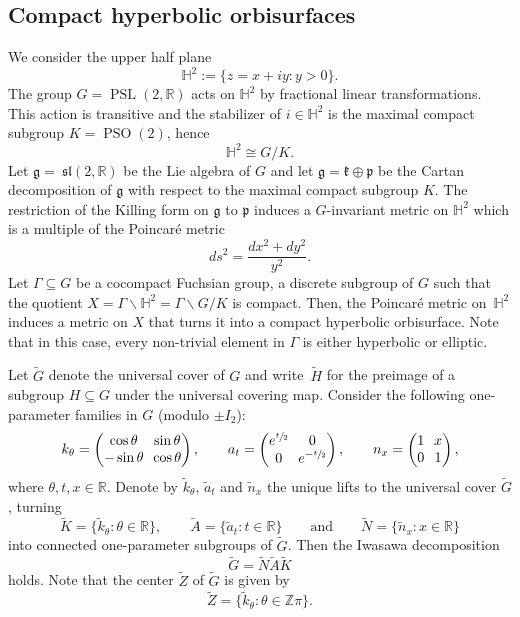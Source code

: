 \documentclass[10pt]{amsart}
\theoremstyle{plain}
\theoremstyle{definition}
\theoremstyle{remark}
\newcommand{\R}{\mathbb{R}}
\newcommand{\Z}{\mathbb{Z}}
\renewcommand{\H}{\mathbb{H}}
\DeclareMathOperator{\PSL}{PSL}
\DeclareMathOperator{\PSO}{PSO}
\numberwithin{equation}{section}
\begin{document}
\subsection{Compact hyperbolic orbisurfaces}
\label{subsec:Orbi}
We consider the upper half plane
\[
\H^2:=\{z=x+iy:y>0\}.
\]
The group $G=\PSL(2,\R)$ acts on $\H^2$ by fractional linear transformations. This action is transitive and the stabilizer of $i\in\H^2$ is the maximal compact subgroup $K=\PSO(2)$, hence
\begin{equation*}
\H^2\cong G/K.
\end{equation*}
Let $\mathfrak{g}=~\mathfrak{sl}(2,\R)$ be the Lie algebra of $G$ and let $\mathfrak{g}=\mathfrak{k}\oplus\mathfrak{p}$ be the Cartan decomposition of $\mathfrak{g}$ with respect to the maximal compact subgroup $K$.
The restriction of the Killing form on $\mathfrak{g}$ to $\mathfrak{p}$ induces a $G$-invariant metric on $\H^2$ which is a multiple of the Poincaré metric
\begin{equation*}
ds^2=\frac{dx^2+dy^2}{y^2}.
\end{equation*}
Let $\Gamma\subseteq G$ be a cocompact Fuchsian group, \ie a discrete subgroup of $G$ such that the quotient $X=\Gamma\backslash \H^2=\Gamma\backslash G/K$ is compact. Then, the Poincaré metric on~$\H^2$ induces a metric on $X$ that turns it into a compact hyperbolic orbisurface. Note that in this case, every non-trivial element in $\Gamma$ is either hyperbolic or elliptic.

Let $\widetilde{G}$ denote the universal cover of $G$ and write~$\widetilde{H}$ for the preimage of a subgroup $H\subseteq G$ under the universal covering map. Consider the following one-parameter families in $G$ (modulo $\pm I_2$):
\[\arraycolsep3.5pt
k_\theta=\begin{pmatrix}\cos\theta&\sin\theta\\-\sin\theta&\cos\theta\end{pmatrix}, \qquad a_t=\begin{pmatrix}e^{\sfrac{t}{2}}&0\\0&e^{-\sfrac{t}{2}}\end{pmatrix}, \qquad n_x=\begin{pmatrix}1&x\\0&1\end{pmatrix},
\]
where $\theta,t,x\in\R$. Denote by $\widetilde{k}_\theta$, $\widetilde{a}_t$ and $\widetilde{n}_x$ the unique lifts to the universal cover $\widetilde{G}$, turning
\[
\widetilde{K}=\{\widetilde{k}_\theta:\theta\in\R\}, \qquad \widetilde{A}=\{\widetilde{a}_t:t\in\R\} \qquad \mbox{and} \qquad \widetilde{N}=\{\widetilde{n}_x:x\in\R\}
\]
into connected one-parameter subgroups of $\widetilde{G}$. Then the Iwasawa decomposition
\[
\widetilde{G} = \widetilde{N}\widetilde{A}\widetilde{K}
\]
holds. Note that the center $\widetilde{Z}$ of $\widetilde{G}$ is given by
\[
\widetilde{Z} = \{\widetilde{k}_\theta:\theta\in\Z\pi\}.
\]
\end{document}
